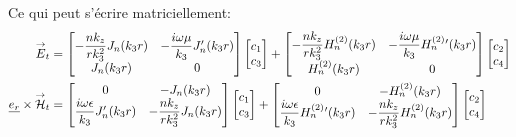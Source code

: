     Ce qui peut s'écrire matriciellement:
    \begin{align}
        {\overset{\rightarrow}{E}}_t &= 
        \begin{bmatrix}
            -\dfrac{nk_z}{rk_3^2}J_n(k_3r) & -\dfrac{i\omega\mu}{k_3}J_n'(k_3r)
            \\
            J_n(k_3r) & 0
        \end{bmatrix}
        \begin{bmatrix}
            c_1 \\
            c_3
        \end{bmatrix}
        +
        \begin{bmatrix}
            -\dfrac{nk_z}{rk_3^2}H_n^{(2)}(k_3r) & -\dfrac{i\omega\mu}{k_3}H_n^{(2)}{}'(k_3r)
            \\
            H_n^{(2)}(k_3r) & 0
        \end{bmatrix}
        \begin{bmatrix}
            c_2 \\
            c_4
        \end{bmatrix}
        \\
        \underline{e_r}\times{\overset{\rightarrow}{\mathcal{H}}}_t &= 
        \begin{bmatrix}
            0 & -J_n(k_3r)
            \\
            \dfrac{i\omega\epsilon}{k_3}J_n'(k_3r) & -\dfrac{nk_z}{rk_3^2}J_n(k_3r)
        \end{bmatrix}
        \begin{bmatrix}
            c_1 \\
            c_3
        \end{bmatrix}
        +
        \begin{bmatrix}
            0 & -H_n^{(2)}(k_3r)
            \\
            \dfrac{i\omega\epsilon}{k_3}H_n^{(2)}{}'(k_3r) & -\dfrac{nk_z}{rk_3^2}H_n^{(2)}(k_3r)
        \end{bmatrix}
        \begin{bmatrix}
            c_2 \\
            c_4
        \end{bmatrix}
    \end{align}

    \newcommand{\mJ}{\mat{J}}
    \newcommand{\mH}{\mat{H}}

